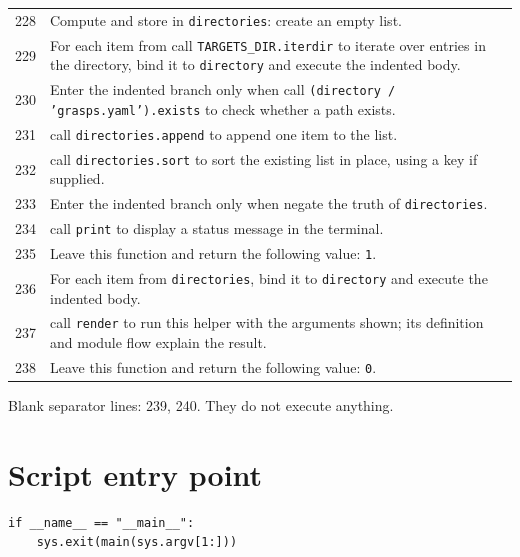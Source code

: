 \documentclass[11pt,a4paper]{book}
\begin{document}
\begin{longtable}{r p{}}
228 & Compute and store in \texttt{directories}: create an empty list.  \\

229 & For each item from call \texttt{TARGETS\_DIR.iterdir} to iterate over entries in the directory, bind it to \texttt{directory} and execute the indented body. \\

230 & Enter the indented branch only when call \texttt{(directory / 'grasps.yaml').exists} to check whether a path exists. \\

231 & call \texttt{directories.append} to append one item to the list. \\

232 & call \texttt{directories.sort} to sort the existing list in place, using a key if supplied. \\

233 & Enter the indented branch only when negate the truth of \texttt{directories}. \\

234 & call \texttt{print} to display a status message in the terminal. \\

235 & Leave this function and return the following value: \texttt{1}. \\

236 & For each item from \texttt{directories}, bind it to \texttt{directory} and execute the indented body. \\

237 & call \texttt{render} to run this helper with the arguments shown; its definition and module flow explain the result. \\

238 & Leave this function and return the following value: \texttt{0}. \\

\end{longtable}

Blank separator lines: 239, 240. They do not execute anything.

\section{Script entry point}

\begin{lstlisting}[firstnumber=241]
if __name__ == "__main__":
    sys.exit(main(sys.argv[1:]))
\end{lstlisting}
\end{document}
